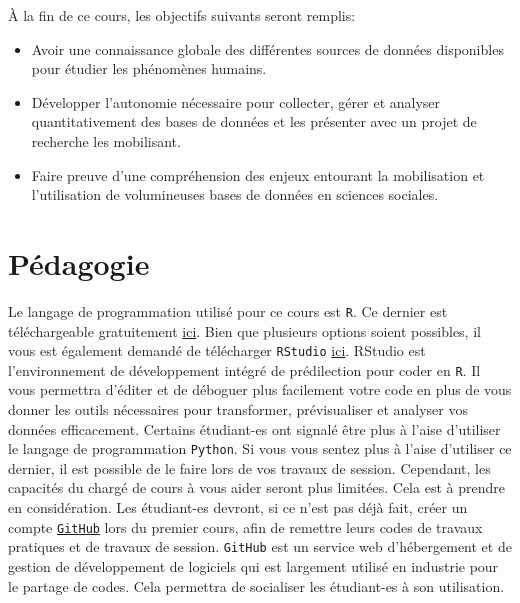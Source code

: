 \documentclass[
  letterpaper,
  DIV=11,
  numbers=noendperiod]{scrartcl}
\begin{document}
À la fin de ce cours, les objectifs suivants seront remplis:

\begin{itemize}
\item
  Avoir une connaissance globale des différentes sources de données
  disponibles pour étudier les phénomènes humains.
\item
  Développer l'autonomie nécessaire pour collecter, gérer et analyser
  quantitativement des bases de données et les présenter avec un projet
  de recherche les mobilisant.
\item
  Faire preuve d'une compréhension des enjeux entourant la mobilisation
  et l'utilisation de volumineuses bases de données en sciences
  sociales.
\end{itemize}

\section{Pédagogie}\label{puxe9dagogie}

Le langage de programmation utilisé pour ce cours est \texttt{R}. Ce
dernier est téléchargeable gratuitement
\href{https://cran.r-project.org/}{ici}. Bien que plusieurs options
soient possibles, il vous est également demandé de télécharger
\texttt{RStudio} \href{https://posit.co/download/rstudio-desktop/}{ici}.
RStudio est l'environnement de développement intégré de prédilection
pour coder en \texttt{R}. Il vous permettra d'éditer et de déboguer plus
facilement votre code en plus de vous donner les outils nécessaires pour
transformer, prévisualiser et analyser vos données efficacement.
Certains étudiant-es ont signalé être plus à l'aise d'utiliser le
langage de programmation \texttt{Python}. Si vous vous sentez plus à
l'aise d'utiliser ce dernier, il est possible de le faire lors de vos
travaux de session. Cependant, les capacités du chargé de cours à vous
aider seront plus limitées. Cela est à prendre en considération. Les
étudiant-es devront, si ce n'est pas déjà fait, créer un compte
\href{https://github.com/}{\texttt{GitHub}} lors du premier cours, afin
de remettre leurs codes de travaux pratiques et de travaux de session.
\texttt{GitHub} est un service web d'hébergement et de gestion de
développement de logiciels qui est largement utilisé en industrie pour
le partage de codes. Cela permettra de socialiser les étudiant-es à son
utilisation.
\end{document}
